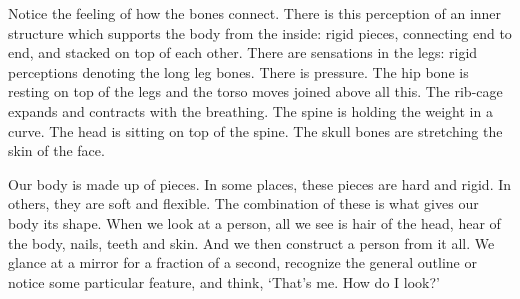 Notice the feeling of how the bones connect. There is this perception of
an inner structure which supports the body from the inside: rigid
pieces, connecting end to end, and stacked on top of each other. There
are sensations in the legs: rigid perceptions denoting the long leg
bones. There is pressure. The hip bone is resting on top of the legs and
the torso moves joined above all this. The rib-cage expands and
contracts with the breathing. The spine is holding the weight in a
curve. The head is sitting on top of the spine. The skull bones are
stretching the skin of the face.

\enlargethispage*{\baselineskip}

Our body is made up of pieces. In some places, these pieces are hard and
rigid. In others, they are soft and flexible. The combination of these
is what gives our body its shape. When we look at a person, all we see
is hair of the head, hear of the body, nails, teeth and skin. And we
then construct a person from it all. We glance at a mirror for a
fraction of a second, recognize the general outline or notice some
particular feature, and think, `That's me. How do I look?'

\clearpage

\enlargethispage*{3\baselineskip}

